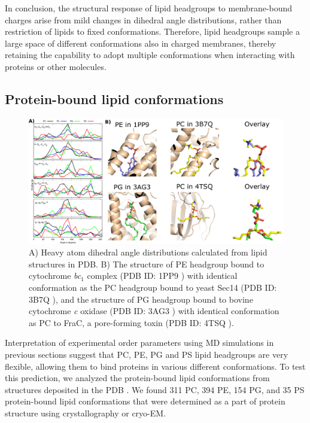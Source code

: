 \documentclass[aps,prl,superscriptaddress,twocolumn]{revtex4}
\begin{document}
In conclusion, the structural response of lipid headgroups to 
membrane-bound charges arise
from mild changes in dihedral angle distributions, rather than restriction of lipids to
fixed conformations. Therefore, lipid headgroups sample a large space of different conformations
also in charged membranes, thereby retaining the capability to adopt multiple conformations when
interacting with proteins or other molecules.



\subsection{Protein-bound lipid conformations}

\begin{figure}[]
  \centering
  \includegraphics[width=19.0cm]{./Figs/figure4.eps}
  \caption{\label{dihedralsFROMpdb}
    A) Heavy atom dihedral angle distributions calculated from lipid structures in PDB.
    B) The structure of PE headgroup bound to cytochrome {\it bc}$_1$ complex (PDB ID: 1PP9 \cite{huang05})
    with identical conformation as the PC headgroup bound to yeast Sec14 (PDB ID: 3B7Q \cite{schaaf08}),
    and the structure of PG headgroup bound to bovine cytochrome {\it c} oxidase (PDB ID: 3AG3 \cite{muramoto10})
    with identical conformation as PC to FraC, a pore-forming toxin (PDB ID: 4TSQ \cite{tanaka15}).
  }
\end{figure}


Interpretation of experimental order parameters using MD simulations
in previous sections suggest that PC, PE, PG and PS lipid headgroups are very flexible,
allowing them to bind proteins in various different conformations.
To test this prediction, we analyzed the protein-bound lipid conformations
from structures deposited in the PDB \cite{berman00}.
We found 311 PC, 394 PE, 154 PG, and 35 PS protein-bound lipid conformations
that were determined as a part of protein structure using crystallography or cryo-EM. 
\end{document}
